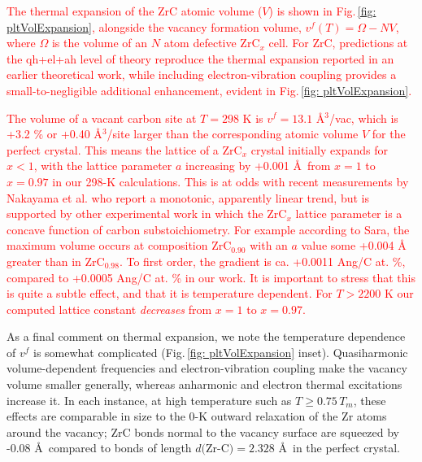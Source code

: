 \documentclass[twocolumn,american,aps,prb,showpacs,showkeys,amsmath,amssymb,superscriptaddress,a4]{revtex4-1}
\begin{document}
 \textcolor{red}{The thermal expansion of the ZrC atomic volume ($V$) is shown in Fig.\,\ref{fig: pltVolExpansion}, alongside the vacancy formation volume, $v^f(T)=\Omega-NV$, where $\Omega$ is the volume of an  $N$ atom defective ZrC$_x$ cell. For ZrC, predictions at the qh+el+ah level of theory reproduce the thermal expansion reported in an earlier theoretical work,\citep{Duff2015} while including electron-vibration coupling provides a small-to-negligible additional enhancement, evident in Fig.\,\ref{fig: pltVolExpansion}. }

 \textcolor{red}{The volume of a vacant carbon site at $T=298$ K is $v^f=13.1$ \AA$^3$/vac, which is +3.2 \% or +0.40 \AA$^3$/site larger than the corresponding atomic volume $V$ for the perfect crystal. This means the lattice of a ZrC$_x$ crystal initially expands for $x<1$, with the lattice parameter $a$ increasing by +0.001 \AA$\,$  from $x=1$ to $x=0.97$ in our 298-K calculations. This is at odds with recent measurements by Nakayama et al.\citep{Nakayama2017} who report a monotonic, apparently linear trend, but is supported by other experimental work in which the ZrC$_x$ lattice parameter is a concave function of carbon substoichiometry.\citep{Sara1900, Schonfeld2017, Katoh2013, Jackson2011} For example according to Sara,\citep{Sara1900} the maximum volume occurs at composition ZrC$_{0.90}$ with an $a$ value some +0.004 \AA $\,$ greater than in ZrC$_{0.98}$. To first order, the gradient is ca. +0.0011 Ang/C at. \%, compared to +0.0005 Ang/C at. \% in our work. It is important to stress that this is quite a subtle effect, and that it is temperature dependent. For $T>2200$ K our computed lattice constant \emph{decreases} from $x=1$ to $x=0.97$. }

As a final comment on thermal expansion, we note the temperature dependence of $v^f$ is somewhat complicated (Fig.\,\ref{fig: pltVolExpansion} inset). Quasiharmonic volume-dependent frequencies and electron-vibration coupling make the vacancy volume smaller generally, whereas anharmonic and electron thermal excitations increase it. In each instance, at high temperature such as $T\ge0.75\,T_m$, these effects are comparable in size to the 0-K outward relaxation of the Zr atoms around the vacancy; ZrC bonds normal to the vacancy surface are squeezed by -0.08 \AA$\,$ compared to bonds of length $d\text{(Zr-C)}=2.328$ \AA$\,$ in the perfect crystal.
\end{document}
